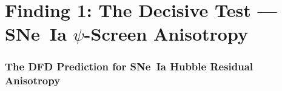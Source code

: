\documentclass[11pt,a4paper]{article}
\begin{document}
\part{Finding 1: The Decisive Test --- SNe~Ia $\psi$-Screen Anisotropy}
\label{sec:sne-anisotropy}


\section{The DFD Prediction for SNe~Ia Hubble Residual Anisotropy}
\end{document}

